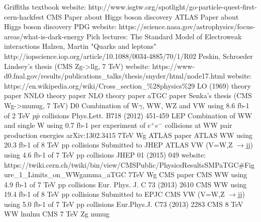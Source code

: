 \begin{thebibliography}{1}
 Griffiths textbook
 website: http://www.isgtw.org/spotlight/go-particle-quest-first-cern-hackfest
 CMS Paper about Higgs boson discovery
 ATLAS Paper about Higgs boson discovery
 PDG
 website: https://science.nasa.gov/astrophysics/focus-areas/what-is-dark-energy
 Pich lectures: The Standard Model of Electroweak interactions
 Halzen, Martin "Quarks and leptons"
 http://iopscience.iop.org/article/10.1088/0034-4885/70/1/R02
 Peskin, Schroeder
 Lindsey's thesis (CMS Zg->llg, 7 TeV)
 website: https://www-d0.fnal.gov/results/publications\_talks/thesis/snyder/html/node17.html
 website: https://en.wikipedia.org/wiki/Cross\_section\_\%28physics\%29
 LO (1969) theory paper
 NNLO theory paper
 NLO theory paper
 aTGC paper
 Senka's thesis (CMS Wg->munug, 7 TeV)
 D0 Combination of W$\gamma$, WW, WZ and VW using 8.6 fb-1 of 2 TeV $p\bar{p}$ collisions Phys.Lett. B718 (2012) 451-459 
 LEP Combination of WW and single W using 0.7 fb-1 per experiment of $e^+e^-$ collisions at WW pair production energies arXiv:1302.3415
 7TeV Wg ATLAS paper
 ATLAS WW using 20.3 fb-1 of 8 TeV pp collisions Submitted to JHEP
 ATLAS VW (V=W,Z $\rightarrow$jj) using 4.6 fb-1 of 7 TeV pp collisions JHEP 01 (2015) 049
 website: https://twiki.cern.ch/twiki/bin/view/CMSPublic/PhysicsResultsSMPaTGC\#Figure\_1\_Limits\_on\_WWgamma\_aTGC
 7TeV Wg CMS paper
 CMS WW using 4.9 fb-1 of 7 TeV pp collisions Eur. Phys. J. C 73 (2013) 2610
 CMS WW using 19.4 fb-1 of 8 TeV pp collisions Submitted to EPJC
 CMS VW (V=W,Z $\rightarrow$jj) using 5.0 fb-1 of 7 TeV pp collisions Eur.Phys.J. C73 (2013) 2283
 CMS 8 TeV WW lnulnu
 CMS 7 TeV Zg nunug




\end{thebibliography}
